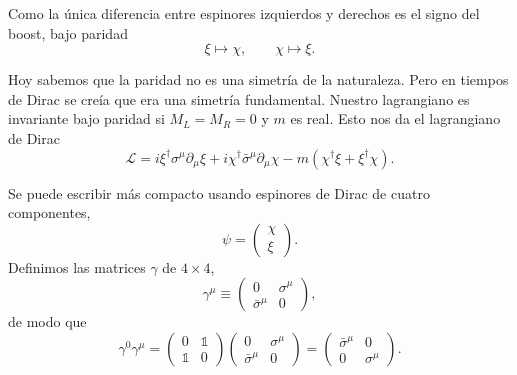 \documentclass[11pt,a4paper]{article}
\newcommand{\concept}[1]{\textcolor{concept-green}{#1}}
\begin{document}
Como la única diferencia entre espinores izquierdos y derechos es el signo del boost, bajo paridad
\[
  \xi\longmapsto\chi,
  \qquad
  \chi\longmapsto\xi.
\]

Hoy sabemos que la paridad no es una simetría de la naturaleza. Pero en tiempos de Dirac se creía que era una simetría fundamental. Nuestro lagrangiano es invariante bajo paridad si $M_L=M_R=0$ y $m$ es real. Esto nos da el \concept{lagrangiano de Dirac}
\[
  \mathcal L=
  i\xi^\dagger\sigma^\mu\partial_\mu\xi
  +i\chi^\dagger\bar\sigma^\mu\partial_\mu\chi
  -m\left(\chi^\dagger\xi+\xi^\dagger\chi\right).
\]

Se puede escribir más compacto usando \concept{espinores de Dirac} de cuatro componentes,
\[
  \psi=
  \begin{pmatrix}
    \chi\\
    \xi
  \end{pmatrix}.
\]
Definimos las matrices $\gamma$ de $4\times4$,
\[
  \gamma^\mu\equiv
  \begin{pmatrix}
    0&\sigma^\mu\\
    \bar\sigma^\mu&0
  \end{pmatrix},
\]
de modo que
\[
  \gamma^0\gamma^\mu
  =
  \begin{pmatrix}
    0&\mathbb{1}\\
    \mathbb{1}&0
  \end{pmatrix}
  \begin{pmatrix}
    0&\sigma^\mu\\
    \bar\sigma^\mu&0
  \end{pmatrix}
  =
  \begin{pmatrix}
    \bar\sigma^\mu&0\\
    0&\sigma^\mu
  \end{pmatrix}.
\]
\end{document}

